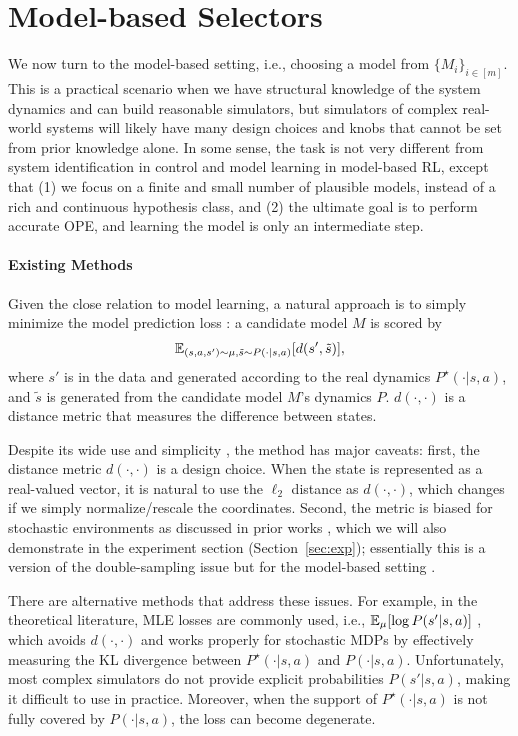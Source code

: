 \section{Model-based Selectors} \label{sec:mb-select}

We now turn to the model-based setting, i.e., choosing a model from $\{M_i\}_{i\in[m]}$. This is a practical scenario when we have structural knowledge of the system dynamics and can build reasonable simulators, but simulators of complex real-world systems will likely have many design choices and knobs that cannot be set from prior knowledge alone. In some sense, the task is not very different from  system identification in control and model learning in model-based RL, except that (1) we focus on a finite and small number of plausible models, instead of a rich and continuous hypothesis class, and (2) the ultimate goal is to perform accurate OPE, and learning the model is only an intermediate step.%

\paragraph{Existing Methods} Given the close relation to model learning, a natural approach is to simply minimize the model prediction loss \cite{jiang2024note}: a candidate model $M$ is  scored by
\begin{align} \label{eq:naive}
\mathbb{E}_{(s,a,s')\sim \mu, \tilde s \sim P(\cdot|s,a)}[d(s', \tilde s)],
\end{align}
where $s'$ is in the data and generated according to the real dynamics $P^\star(\cdot|s,a)$, and $\tilde s$ is generated from the candidate model $M$'s dynamics $P$. $d(\cdot, \cdot)$ is a distance metric that measures the difference between states. 

Despite its wide use and simplicity \cite{nagabandi2018neural}, the method has  major caveats: first, the distance metric $d(\cdot, \cdot)$ is a design choice. When the state is represented as a real-valued vector, it is natural to use the $\ell_2$ distance as $d(\cdot, \cdot)$, which changes if we simply normalize/rescale the coordinates. Second, the metric is biased for stochastic environments as discussed in prior works \cite{jiang2024note, voelcker2023lambda}, which we will also demonstrate in the experiment section (Section~\ref{sec:exp}); essentially this is a version of the double-sampling issue but for the model-based setting \cite{amortila2024reinforcement}. 

There are alternative methods that address these issues. For example, in the theoretical literature, MLE losses are commonly used, i.e., $\mathbb{E}_{\mu}[\log P(s'|s,a)]$ \cite{agarwal2020flambe, uehara2021representation, liu2023optimistic}, which avoids $d(\cdot, \cdot)$ and works properly for stochastic MDPs by effectively measuring the KL divergence between $P^\star(\cdot|s,a)$ and $P(\cdot|s,a)$. Unfortunately, most complex simulators do not provide explicit probabilities $P(s'|s,a)$, making it difficult to use in practice. Moreover, when the support of $P^\star(\cdot|s,a)$ is not fully covered by $P(\cdot|s,a)$, the loss can become degenerate. 


